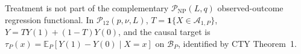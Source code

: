 Treatment is not part of the complementary \(\mathcal P_{\mathrm{NP}}(L,q)\) observed-outcome regression functional.  In \(\mathcal P_{12}(p,\nu,L)\), \(T=\mathbf1\{X\in\mathcal A_{1,P}\}\), \(Y=TY(1)+(1-T)Y(0)\), and the causal target is \(\tau_P(x)=\mathbb E_P[Y(1)-Y(0)\mid X=x]\) on \(\mathcal B_P\), identified by CTY Theorem~1.